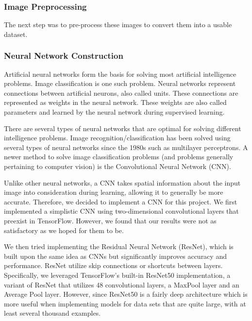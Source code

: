 \documentclass[11pt]{article}
\begin{document}
  \subsubsection{Image Preprocessing}
  The next step was to pre-process these images to convert them into a
  usable dataset. 

  
  \subsubsection{Neural Network Construction}
  Artificial neural networks form the basis for solving most artificial intelligence 
  problems. Image classification is one such problem. Neural networks represent connections 
  between artificial neurons, also called units. These connections are represented as weights 
  in the neural network. These weights are also called parameters and 
  learned by the neural network during supervised learning.

  There are several types of neural networks that are optimal for solving different 
  intelligence problems. Image recognition/classification has been solved using 
  several types of neural networks since the 1980s such as multilayer perceptrons. 
  A newer method to solve image classification problems (and problems generally 
  pertaining to computer vision) is the Convolutional Neural Network (CNN). 
  
  Unlike other neural networks, a CNN takes spatial information about the input image 
  into consideration during learning, allowing it to generally be more accurate. Therefore, 
  we decided to implement a CNN for this project. We first implemented a simplistic 
  CNN using two-dimensional convolutional layers that preexist in TensorFlow. However, 
  we found that our results were not as satisfactory as we hoped for them to be.

  We then tried implementing the Residual Neural Network (ResNet), which is built
  upon the same idea as CNNs but significantly improves accuracy and performance. 
  ResNet utilize skip connections or shortcuts between layers. Specifically, we leveraged 
  TensorFlow's built-in ResNet50 implementation, a variant of ResNet that utilizes 
  48 convolutional layers, a MaxPool layer and an Average Pool layer. However, since 
  ResNet50 is a fairly deep architecture which is more useful when implementing models 
  for data sets that are quite large, with at least several thousand examples.
\end{document}
